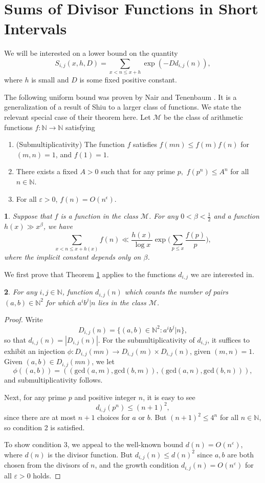 \documentclass[12pt,english,BCOR7.5mm]{amsart}
\numberwithin{equation}{section}
\numberwithin{figure}{section}
\theoremstyle{definition}
\theoremstyle{plain}
\newtheorem{thm}{\protect\theoremname}
\theoremstyle{plain}
\newtheorem{lem}[thm]{\protect\lemmaname}
\theoremstyle{plain}
\theoremstyle{definition}
\theoremstyle{plain}
\theoremstyle{plain}
\providecommand{\lemmaname}{Lemma}
\providecommand{\theoremname}{Theorem}
\begin{document}
\section*{Sums of Divisor Functions in Short Intervals}

We will be interested on a lower bound on the quantity
\[
S_{i,j}(x,h,D)=\sum_{x<n\leq x+h}\exp(-Dd_{i,j}(n)),
\]
where $h$ is small and $D$ is some fixed positive constant.

The following uniform bound was proven by Nair and Tenenbaum \cite{NT}.
It is a generalization of a result of Shiu \cite{Shiu} to a larger
class of functions. We state the relevant special case of their theorem
here. Let $\mathcal{M}$ be the class of arithmetic functions $f:\mathbb{N}\rightarrow\mathbb{N}$
satisfying
\begin{enumerate}
\item (Submultiplicativity) The function $f$ satisfies $f(mn)\leq f(m)f(n)$
for $(m,n)=1$, and $f(1)=1$.
\item There exists a fixed $A>0$ such that for any prime $p,$ $f(p^{n})\leq A^{n}$
for all $n\in\mathbb{N}$.
\item For all $\varepsilon>0$, $f(n)=O(n^{\epsilon})$.\end{enumerate}
\begin{thm}
\label{thm:shiu}\cite{NT} Suppose that $f$ is a function in the
class $\mathcal{M}$. For any $0<\beta<\frac{1}{2}$ and a function
$h(x)\gg x^{\beta}$, we have
\[
\sum_{x<n\leq x+h(x)}f(n)\ll\frac{h(x)}{\log x}\exp\Big(\sum_{p\leq x}\frac{f(p)}{p}\Big),
\]
where the implicit constant depends only on $\beta$.
\end{thm}
We first prove that Theorem \ref{thm:shiu} applies to the functions
$d_{i,j}$ we are interested in.
\begin{lem}
For any $i,j\in\mathbb{N}$, function $d_{i,j}(n)$ which counts the
number of pairs $(a,b)\in\mathbb{N}^{2}$ for which $a^{i}b^{j}|n$
lies in the class $\mathcal{M}$.\end{lem}
\begin{proof}
Write
\[
D_{i,j}(n)=\{(a,b)\in\mathbb{N}^{2}:a^{i}b^{j}|n\},
\]
so that $d_{i,j}(n)=|D_{i,j}(n)|$. For the submultiplicativity of
$d_{i,j}$, it suffices to exhibit an injection $\phi:D_{i,j}(mn)\rightarrow D_{i,j}(m)\times D_{i,j}(n)$,
given $(m,n)=1$. Given $(a,b)\in D_{i,j}(mn)$, we let
\[
\phi((a,b))=((\mbox{gcd}(a,m),\mbox{gcd}(b,m)),(\mbox{gcd}(a,n),\mbox{gcd}(b,n))),
\]
and submultiplicativity follows. 

Next, for any prime $p$ and positive integer $n$, it is easy to
see
\[
d_{i,j}(p^{n})\leq(n+1)^{2},
\]
since there are at most $n+1$ choices for $a$ or $b$. But $(n+1)^{2}\leq4^{n}$
for all $n\in\mathbb{N}$, so condition 2 is satisfied. 

To show condition 3, we appeal to the well-known bound $d(n)=O(n^{\varepsilon})$,
where $d(n)$ is the divisor function. But $d_{i,j}(n)\leq d(n)^{2}$
since $a,b$ are both chosen from the divisors of $n$, and the growth
condition $d_{i,j}(n)=O(n^{\varepsilon})$ for all $\varepsilon>0$
holds.
\end{proof}
\end{document}
